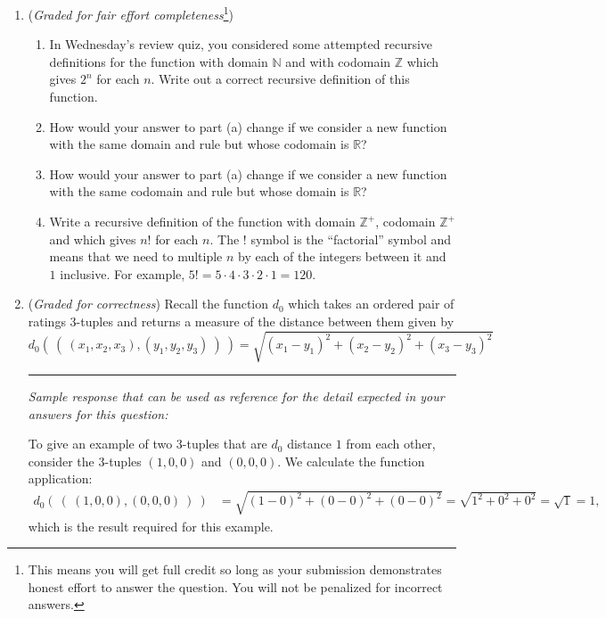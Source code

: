 \documentclass[12pt, oneside]{article}
\begin{document}
\begin{enumerate}
\item ({\it Graded for fair effort completeness}\footnote{This means 
you will get full credit so long as your submission demonstrates honest 
effort to answer the question. You will not be penalized for incorrect answers.}) 

\begin{enumerate}
    \item In Wednesday's review quiz, you considered some attempted 
    recursive definitions for the function
    with domain $\mathbb{N}$ and with codomain $\mathbb{Z}$
    which gives $2^n$ for each $n$. 
    Write out a correct recursive definition of this function.
    \item How would your answer to part (a) change if we consider
    a new function with the same domain and rule but whose codomain 
    is $\mathbb{R}$?
    \item How would your answer to part (a) change if we consider
    a new function with the same codomain and rule but whose domain 
    is $\mathbb{R}$?
    \item Write a recursive definition of the function with domain $\mathbb{Z}^+$,
    codomain $\mathbb{Z}^+$ and which gives $n!$ for each $n$. The $!$ symbol
    is the ``factorial'' symbol and means that we need to multiple $n$ by each of the integers
    between it and $1$ inclusive. For example, $5! = 5 \cdot 4 \cdot 3 \cdot 2 \cdot 1 = 120$.
\end{enumerate}

\item ({\it Graded for correctness}) Recall the function
$d_0$ which takes an ordered pair of ratings $3$-tuples and returns a measure
of the distance between them 
given by
\[
d_0 (~(~ (x_1, x_2, x_3), (y_1, y_2, y_3) ~) ~) = \sqrt{ (x_1 - y_1)^2 + (x_2 - y_2)^2 + (x_3 -y_3)^2}
\]

\rule{0.5\textwidth}{.4pt}

{\it Sample response that can be used as reference for the detail expected 
in your answers for this question: } 

To give an example of two $3$-tuples that are $d_0$ distance $1$ from each other, 
consider the $3$-tuples $(1,0,0)$ and $(0,0,0)$. We calculate the function application:
\begin{align*}
    d_0 (~(~ (1, 0,0), (0,0,0) ~) ~) &= \sqrt{ (1 - 0)^2 + (0 - 0)^2 + (0 -0)^2} = \sqrt{1^2 + 0^2 + 0^2} = \sqrt{1} = 1,
\end{align*}
which is the result required for this example.


\end{enumerate}
\end{document}
